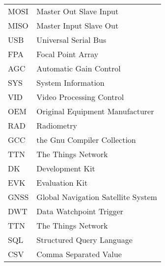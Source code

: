 \begin{flushleft}
\begin{longtable}[l]{p{2.5cm}l}
        MOSI    & Master Out Slave Input\\
        MISO    & Master Input Slave Out \\
        USB     & Universal Serial Bus\\
        FPA     & Focal Point Array\\
        AGC     & Automatic Gain Control\\
        SYS     & System Information\\
        VID     & Video Processing Control\\
        OEM     & Original Equipment Manufacturer\\
        RAD     & Radiometry\\
        GCC     & the Gnu Compiler Collection\\
        TTN     & The Things Network\\
        DK      & Development Kit\\
        EVK     & Evaluation Kit\\
        GNSS    & Global Navigation Satellite System\\
        DWT     & Data Watchpoint Trigger\\
        TTN     & The Things Network\\
        SQL     & Structured Query Language\\
        CSV     & Comma Separated Value\\
\end{longtable}
\end{flushleft}
\endgroup

\newpage
